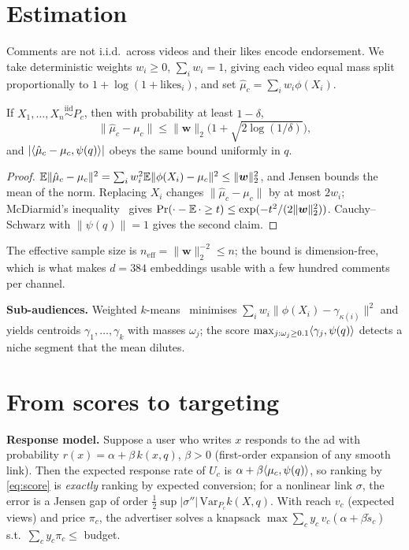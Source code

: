 \documentclass[10pt,twocolumn]{article}
\begin{document}
\section{Estimation}
Comments are not i.i.d.\ across videos and their likes encode endorsement. We take deterministic weights $w_i\ge0$, $\sum_iw_i=1$, giving each video equal mass split proportionally to $1+\log(1+\mathrm{likes}_i)$, and set $\hat\mu_c=\sum_iw_i\phi(X_i)$.
\begin{proposition}[concentration]
If $X_1,\dots,X_n\overset{\mathrm{iid}}{\sim}P_c$, then with probability at least $1-\delta$,
\[
\|\hat\mu_c-\mu_c\|\le\|\bm w\|_2\big(1+\sqrt{2\log(1/\delta)}\big),
\]
and $|\langle \hat\mu_c-\mu_c,\psi(q)\rangle|$ obeys the same bound uniformly in $q$.
\end{proposition}
\begin{proof}
$\mathbb{E}\|\hat\mu_c-\mu_c\|^2=\sum_iw_i^2\mathbb{E}\|\phi(X_i)-\mu_c\|^2\le\|\bm w\|_2^2$, and Jensen bounds the mean of the norm. Replacing $X_i$ changes $\|\hat\mu_c-\mu_c\|$ by at most $2w_i$; McDiarmid's inequality~\cite{mcdiarmid1989} gives $\Pr(\cdot-\mathbb{E}\,\cdot\ge t)\le\exp(-t^2/(2\|\bm w\|_2^2))$. Cauchy--Schwarz with $\|\psi(q)\|=1$ gives the second claim.
\end{proof}
The effective sample size is $n_{\mathrm{eff}}=\|\bm w\|_2^{-2}\le n$; the bound is dimension-free, which is what makes $d=384$ embeddings usable with a few hundred comments per channel.

\textbf{Sub-audiences.} Weighted $k$-means~\cite{lloyd1982} minimises $\sum_iw_i\|\phi(X_i)-\gamma_{\kappa(i)}\|^2$ and yields centroids $\gamma_1,\dots,\gamma_k$ with masses $\omega_j$; the score $\max_{j:\omega_j\ge0.1}\langle \gamma_j,\psi(q)\rangle$ detects a niche segment that the mean dilutes.

\section{From scores to targeting}
\textbf{Response model.} Suppose a user who writes $x$ responds to the ad with probability $r(x)=\alpha+\beta\,k(x,q)$, $\beta>0$ (first-order expansion of any smooth link). Then the expected response rate of $U_c$ is $\alpha+\beta\langle \mu_c,\psi(q)\rangle$, so ranking by \eqref{eq:score} is \emph{exactly} ranking by expected conversion; for a nonlinear link $\sigma$, the error is a Jensen gap of order $\tfrac12\sup|\sigma''|\,\mathrm{Var}_{P_c}k(X,q)$. With reach $v_c$ (expected views) and price $\pi_c$, the advertiser solves a knapsack $\max\sum_c y_c\,v_c(\alpha+\beta\tilde s_c)$ s.t.\ $\sum_cy_c\pi_c\le$ budget.
\end{document}
